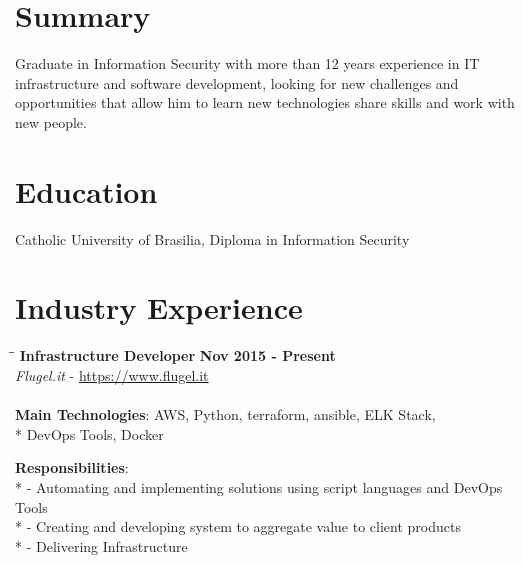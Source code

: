 \documentclass[margin]{res}
\begin{document}

\address{Pederneiras, SP, Brazil \\
  \href{mailto:brunocriado@gmail.com}{brunocriado@gmail.com} \\ Phone: 55 14 98136 8331}


\begin{resume}

  \section{Summary} Graduate in Information Security with more than 12 years
  experience in IT infrastructure and software development, looking for new
  challenges and opportunities that allow him to learn new technologies share
  skills and work with new people.

  \section{Education} Catholic University of Brasilia, Diploma in Information
  Security


\section{Industry Experience}


\vspace{-0.1in}
\begin{tabbing}
  \hspace{2.3in}\= \hspace{1.7in}\= \kill %
  \textbf{Infrastructure Developer}    \>\>\textbf{Nov 2015 - Present}\\
  \textit{Flugel.it} - \url{https://www.flugel.it}\\\\
  \textbf{Main Technologies}: AWS, Python, terraform, ansible, ELK Stack,\\*
  DevOps Tools, Docker
\end{tabbing}\vspace{-20pt}      %
\vspace{2mm}\textbf{Responsibilities}: \\*
  - Automating and implementing solutions using script languages and DevOps Tools \\*
  - Creating and developing system to aggregate value to client products \\*
  - Delivering Infrastructure\\


\end{resume}
\end{document}
